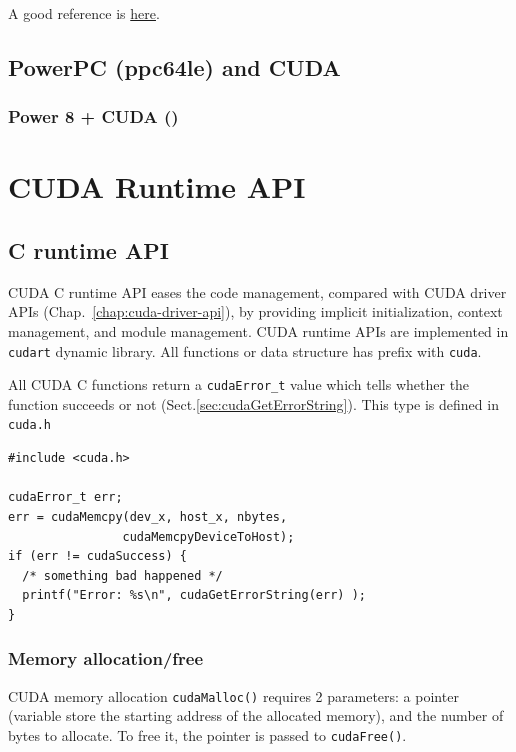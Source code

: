 A good reference is \href{http://sites.google.com/site/adelfahmed/nvidia-cuda-experience}{here}.


\section{PowerPC (ppc64le) and CUDA}
\label{sec:PowerPC-CUDA}

\subsection{Power 8 + CUDA ()}

\chapter{CUDA Runtime API}


\section{C runtime API}
\label{sec:runtime-api}

CUDA C runtime API eases the code management, compared with CUDA
driver APIs (Chap.~\ref{chap:cuda-driver-api}), by providing implicit
initialization, context management, and module management. CUDA
runtime APIs are implemented in \verb!cudart!  dynamic library. All
functions or data structure has prefix with \verb!cuda!.

All CUDA C functions return a \verb!cudaError_t! value which tells whether the
function succeeds or not (Sect.\ref{sec:cudaGetErrorString}). This type is
defined in \verb!cuda.h!
\begin{lstlisting}
#include <cuda.h>

cudaError_t err;
err = cudaMemcpy(dev_x, host_x, nbytes, 
                cudaMemcpyDeviceToHost);
if (err != cudaSuccess) {
  /* something bad happened */
  printf("Error: %s\n", cudaGetErrorString(err) );
}
\end{lstlisting}

\subsection{Memory allocation/free}
\label{sec:memory-allocation}

CUDA memory allocation \verb!cudaMalloc()! requires 2 parameters: a
pointer (variable store the starting address of the allocated memory),
and the number of bytes to allocate. To free it, the pointer is passed
to \verb!cudaFree()!. 

